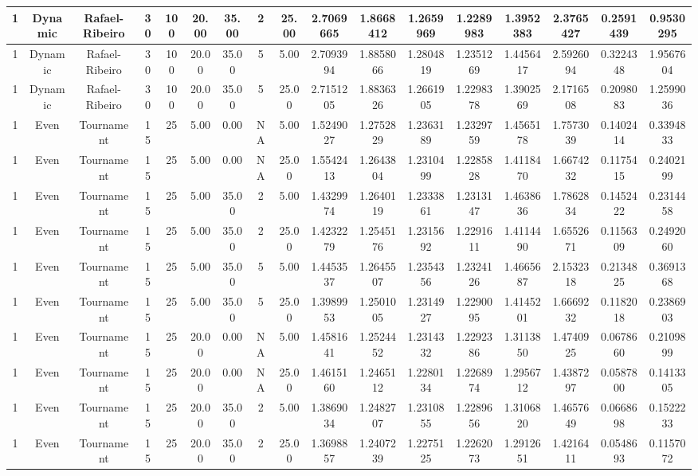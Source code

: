\documentclass[a4paper]{article}
\begin{document}
\begin{center}
\begin{tabular}{ | c | c | c | c | c | c | c | c | c | c | c | c | c | c | c | c | c | }
		\hline
		1	&	Dynamic	&	Rafael-Ribeiro	&	30	&	100	&	20.00	&	35.00	&	2	&	25.00	&	2.7069665	&	1.8668412	&	1.2659969	&	1.2289983	&	1.3952383	&	2.3765427	&	0.2591439	&	0.9530295 \\
		\hline
		1	&	Dynamic	&	Rafael-Ribeiro	&	30	&	100	&	20.00	&	35.00	&	5	&	5.00	&	2.7093994	&	1.8858066	&	1.2804819	&	1.2351269	&	1.4456417	&	2.5926094	&	0.3224348	&	1.9567604 \\
		\hline
		1	&	Dynamic	&	Rafael-Ribeiro	&	30	&	100	&	20.00	&	35.00	&	5	&	25.00	&	2.7151205	&	1.8836326	&	1.2661905	&	1.2298378	&	1.3902569	&	2.1716508	&	0.2098083	&	1.2599036 \\
		\hline
		1	&	Even	&	Tournament	&	15	&	25	&	5.00	&	0.00	&	NA	&	5.00	&	1.5249027	&	1.2752829	&	1.2363189	&	1.2329759	&	1.4565178	&	1.7573039	&	0.1402414	&	0.3394833 \\
		\hline
		1	&	Even	&	Tournament	&	15	&	25	&	5.00	&	0.00	&	NA	&	25.00	&	1.5542413	&	1.2643804	&	1.2310499	&	1.2285828	&	1.4118470	&	1.6674232	&	0.1175415	&	0.2402199 \\
		\hline
		1	&	Even	&	Tournament	&	15	&	25	&	5.00	&	35.00	&	2	&	5.00	&	1.4329974	&	1.2640119	&	1.2333861	&	1.2313147	&	1.4638636	&	1.7862834	&	0.1452422	&	0.2314458 \\
		\hline
		1	&	Even	&	Tournament	&	15	&	25	&	5.00	&	35.00	&	2	&	25.00	&	1.4232279	&	1.2545176	&	1.2315692	&	1.2291611	&	1.4114490	&	1.6552671	&	0.1156309	&	0.2492060 \\
		\hline
		1	&	Even	&	Tournament	&	15	&	25	&	5.00	&	35.00	&	5	&	5.00	&	1.4453537	&	1.2645507	&	1.2354356	&	1.2324126	&	1.4665687	&	2.1532318	&	0.2134825	&	0.3691368 \\
		\hline
		1	&	Even	&	Tournament	&	15	&	25	&	5.00	&	35.00	&	5	&	25.00	&	1.3989953	&	1.2501005	&	1.2314927	&	1.2290095	&	1.4145201	&	1.6669232	&	0.1182018	&	0.2386903 \\
		\hline
		1	&	Even	&	Tournament	&	15	&	25	&	20.00	&	0.00	&	NA	&	5.00	&	1.4581641	&	1.2524452	&	1.2314332	&	1.2292386	&	1.3113850	&	1.4740925	&	0.0678660	&	0.2109899 \\
		\hline
		1	&	Even	&	Tournament	&	15	&	25	&	20.00	&	0.00	&	NA	&	25.00	&	1.4615160	&	1.2465112	&	1.2280134	&	1.2268974	&	1.2956712	&	1.4387297	&	0.0587800	&	0.1413305 \\
		\hline
		1	&	Even	&	Tournament	&	15	&	25	&	20.00	&	35.00	&	2	&	5.00	&	1.3869034	&	1.2482707	&	1.2310855	&	1.2289656	&	1.3106820	&	1.4657649	&	0.0668698	&	0.1522233 \\
		\hline
		1	&	Even	&	Tournament	&	15	&	25	&	20.00	&	35.00	&	2	&	25.00	&	1.3698857	&	1.2407239	&	1.2275125	&	1.2262073	&	1.2912651	&	1.4216411	&	0.0548693	&	0.1157072 \\

\end{tabular}
\end{center}
\end{document}
